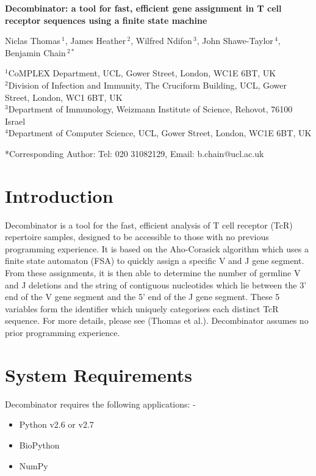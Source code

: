 \documentclass[10pt]{article}
\begin{document}
\begin{flushleft}
{\Large
\textbf{Decombinator: a tool for fast, efficient gene assignment in T cell receptor sequences using a finite state machine}
}

Niclas Thomas\,$^{1}$,
James Heather\,$^{2}$,
Wilfred Ndifon\,$^{3}$,
John Shawe-Taylor\,$^{4}$,
Benjamin Chain\,$^{2*}$

\addvspace{20pt}

$^{1}$CoMPLEX Department, UCL, Gower Street, London, WC1E 6BT, UK\\
$^{2}$Division of Infection and Immunity, The Cruciform Building, UCL, Gower Street, London, WC1 6BT, UK\\
$^{3}$Department of Immunology, Weizmann Institute of Science, Rehovot, 76100 Israel\\
$^{4}$Department of Computer Science, UCL, Gower Street, London, WC1E 6BT, UK

\addvspace{20pt}

\small{*Corresponding Author: Tel: 020 31082129, Email: b.chain@ucl.ac.uk}

\end{flushleft}

\section*{Introduction}
Decombinator is a tool for the fast, efficient analysis of T cell receptor (TcR) repertoire samples, designed to be accessible to those with no previous programming experience. It is based on the Aho-Corasick algorithm which uses a finite state automaton (FSA) to quickly assign a specific V and J gene segment. From these assignments, it is then able to determine the number of germline V and J deletions and the string of contiguous nucleotides which lie between the 3' end of the V gene segment and the 5' end of the J gene segment. These 5 variables form the identifier which uniquely categorises each distinct TcR sequence. For more details, please see (Thomas et al.). Decombinator assumes no prior programming experience.
\\
\section*{System Requirements}
Decombinator requires the following applications: -
\begin{itemize}
\item Python v2.6 or v2.7
\item BioPython
\item NumPy
\end{itemize}
\end{document}
